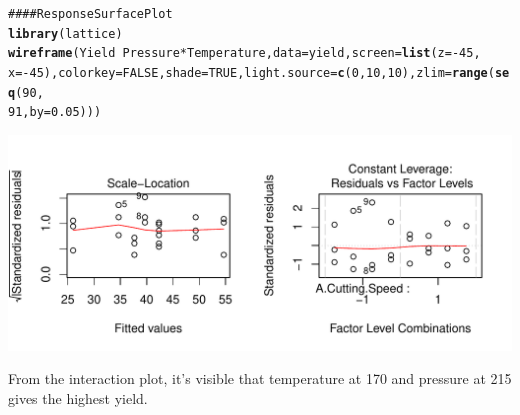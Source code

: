 \documentclass[a4paper]{article}\usepackage{graphicx, color}
\makeatletter
\def\maxwidth{ %
  \ifdim\Gin@nat@width>\linewidth
    \linewidth
  \else
    \Gin@nat@width
  \fi
}
\newcommand{\hlfunctioncall}[1]{\textcolor[rgb]{0.501960784313725,0,0.329411764705882}{\textbf{#1}}}%
\newcommand{\hlcomment}[1]{\textcolor[rgb]{0.180392156862745,0.6,0.341176470588235}{#1}}%
\newenvironment{kframe}{%
 \def\at@end@of@kframe{}%
 \ifinner\ifhmode%
  \def\at@end@of@kframe{\end{minipage}}%
  \begin{minipage}{\columnwidth}%
 \fi\fi%
 \def\FrameCommand##1{\hskip\@totalleftmargin \hskip-\fboxsep
 \colorbox{shadecolor}{##1}\hskip-\fboxsep
     \hskip-\linewidth \hskip-\@totalleftmargin \hskip\columnwidth}%
 \MakeFramed {\advance\hsize-\width
   \@totalleftmargin\z@ \linewidth\hsize
   \@setminipage}}%
 {\par\unskip\endMakeFramed%
 \at@end@of@kframe}
\newenvironment{knitrout}{}{} %
\makeatother
\begin{document}
\begin{knitrout}
\begin{kframe}
\begin{alltt}
\hlcomment{#### Response Surface Plot}
\hlfunctioncall{library}(lattice)
\hlfunctioncall{wireframe}(Yield ~ Pressure * Temperature, data = yield, screen = \hlfunctioncall{list}(z = -45, 
    x = -45), colorkey = FALSE, shade = TRUE, light.source = \hlfunctioncall{c}(0, 10, 10), zlim = \hlfunctioncall{range}(\hlfunctioncall{seq}(90, 
    91, by = 0.05)))
\end{alltt}
\end{kframe}
\includegraphics[width=\maxwidth]{figure/unnamed-chunk-52} 

\end{knitrout}

From the interaction plot, it's visible that temperature at 170 and pressure at 215 gives the highest yield.

\vspace{3 mm}
\end{document}
